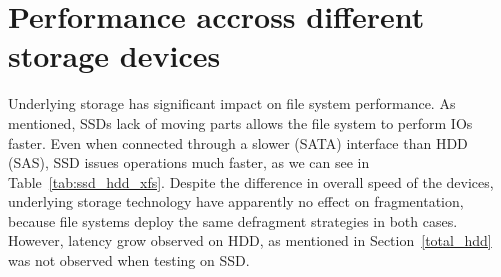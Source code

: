 \documentclass[
  color, %
  table, %
  lof,   %
  lot,   %
]{fithesis3}
\begin{document}


\section{Performance accross different storage devices}
Underlying storage has significant impact on file system performance. As mentioned, SSDs lack of moving parts allows the file system to perform IOs faster. Even when connected through a slower (SATA) interface than HDD (SAS), SSD issues operations much faster, as we can see in Table~\ref{tab:ssd_hdd_xfs}. Despite the difference in overall speed of the devices, underlying storage technology have apparently no effect on fragmentation, because file systems deploy the same defragment strategies in both cases. However, latency grow observed on HDD, as mentioned in Section~\ref{total_hdd} was not observed when testing on SSD.
\end{document}
